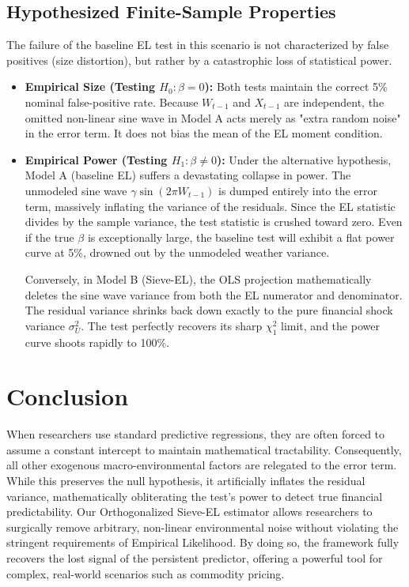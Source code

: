 \documentclass{article}
\begin{document}
\subsection{Hypothesized Finite-Sample Properties}

The failure of the baseline EL test in this scenario is not characterized by false positives (size distortion), but rather by a catastrophic loss of statistical power.

\begin{itemize}
    \item \textbf{Empirical Size (Testing $H_0: \beta = 0$):} Both tests maintain the correct 5\% nominal false-positive rate. Because $W_{t-1}$ and $X_{t-1}$ are independent, the omitted non-linear sine wave in Model A acts merely as "extra random noise" in the error term. It does not bias the mean of the EL moment condition.
    \item \textbf{Empirical Power (Testing $H_1: \beta \neq 0$):} Under the alternative hypothesis, Model A (baseline EL) suffers a devastating collapse in power. The unmodeled sine wave $\gamma \sin(2\pi W_{t-1})$ is dumped entirely into the error term, massively inflating the variance of the residuals. Since the EL statistic divides by the sample variance, the test statistic is crushed toward zero. Even if the true $\beta$ is exceptionally large, the baseline test will exhibit a flat power curve at 5\%, drowned out by the unmodeled weather variance.
    
    Conversely, in Model B (Sieve-EL), the OLS projection mathematically deletes the sine wave variance from both the EL numerator and denominator. The residual variance shrinks back down exactly to the pure financial shock variance $\sigma_U^2$. The test perfectly recovers its sharp $\chi^2_1$ limit, and the power curve shoots rapidly to 100\%.
\end{itemize}

\section{Conclusion}

When researchers use standard predictive regressions, they are often forced to assume a constant intercept to maintain mathematical tractability. Consequently, all other exogenous macro-environmental factors are relegated to the error term. While this preserves the null hypothesis, it artificially inflates the residual variance, mathematically obliterating the test's power to detect true financial predictability. Our Orthogonalized Sieve-EL estimator allows researchers to surgically remove arbitrary, non-linear environmental noise without violating the stringent requirements of Empirical Likelihood. By doing so, the framework fully recovers the lost signal of the persistent predictor, offering a powerful tool for complex, real-world scenarios such as commodity pricing.
\end{document}
